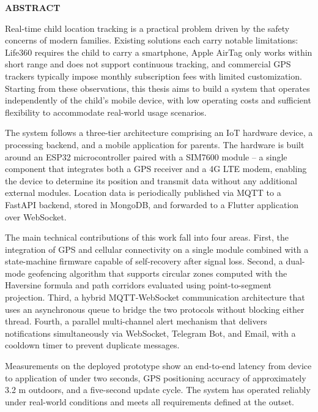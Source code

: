 \documentclass[../DoAn.tex]{subfiles}
\begin{document}
\begin{center}
    \Large{\textbf{ABSTRACT}}\\
\end{center}
\vspace{1cm}

Real-time child location tracking is a practical problem driven by the safety concerns of modern families. Existing solutions each carry notable limitations: Life360 requires the child to carry a smartphone, Apple AirTag only works within short range and does not support continuous tracking, and commercial GPS trackers typically impose monthly subscription fees with limited customization. Starting from these observations, this thesis aims to build a system that operates independently of the child's mobile device, with low operating costs and sufficient flexibility to accommodate real-world usage scenarios.

The system follows a three-tier architecture comprising an IoT hardware device, a processing backend, and a mobile application for parents. The hardware is built around an ESP32 microcontroller paired with a SIM7600 module -- a single component that integrates both a GPS receiver and a 4G LTE modem, enabling the device to determine its position and transmit data without any additional external modules. Location data is periodically published via MQTT to a FastAPI backend, stored in MongoDB, and forwarded to a Flutter application over WebSocket.

The main technical contributions of this work fall into four areas. First, the integration of GPS and cellular connectivity on a single module combined with a state-machine firmware capable of self-recovery after signal loss. Second, a dual-mode geofencing algorithm that supports circular zones computed with the Haversine formula and path corridors evaluated using point-to-segment projection. Third, a hybrid MQTT-WebSocket communication architecture that uses an asynchronous queue to bridge the two protocols without blocking either thread. Fourth, a parallel multi-channel alert mechanism that delivers notifications simultaneously via WebSocket, Telegram Bot, and Email, with a cooldown timer to prevent duplicate messages.

Measurements on the deployed prototype show an end-to-end latency from device to application of under two seconds, GPS positioning accuracy of approximately 3.2 m outdoors, and a five-second update cycle. The system has operated reliably under real-world conditions and meets all requirements defined at the outset.
\end{document}
